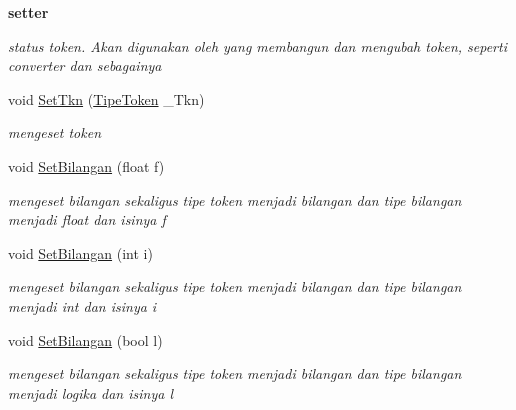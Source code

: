 \begin{Indent}{\bf setter}\par
{\em status token. Akan digunakan oleh yang membangun dan mengubah token, seperti converter dan sebagainya }\begin{DoxyCompactItemize}
\item 
void \hyperlink{class_token_ae785baf319454717be06d9ffb11ffd4c}{Set\-Tkn} (\hyperlink{_token_8h_a29ea73031d51befacf649fa6af865e30}{Tipe\-Token} \-\_\-\-Tkn)
\begin{DoxyCompactList}\small\item\em mengeset token \end{DoxyCompactList}\item 
void \hyperlink{class_token_aee9cf292baf9525d39d01edf5d9d7797}{Set\-Bilangan} (float f)
\begin{DoxyCompactList}\small\item\em mengeset bilangan sekaligus tipe token menjadi bilangan dan tipe bilangan menjadi float dan isinya f \end{DoxyCompactList}\item 
void \hyperlink{class_token_ab36a4340c125fc641e319c5261ab13f7}{Set\-Bilangan} (int i)
\begin{DoxyCompactList}\small\item\em mengeset bilangan sekaligus tipe token menjadi bilangan dan tipe bilangan menjadi int dan isinya i \end{DoxyCompactList}\item 
void \hyperlink{class_token_afe10550438e63b07c82f1ab9fac4fd98}{Set\-Bilangan} (bool l)
\begin{DoxyCompactList}\small\item\em mengeset bilangan sekaligus tipe token menjadi bilangan dan tipe bilangan menjadi logika dan isinya l \end{DoxyCompactList}\end{DoxyCompactItemize}
\end{Indent}

